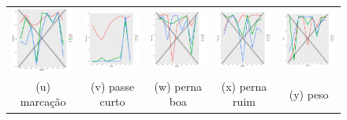 \documentclass[doc,apacite,oneside,a4paper,12pt]{apa6}
\begin{document}
\begin{figure}
\begin{tabular}{ccccc}
   \includegraphics[width=25mm]{marcacao_result_trans_media} & \includegraphics[width=25mm]{passecurto_result_trans_media}   &   \includegraphics[width=25mm]{pernaboa_result_trans_media}&
  \includegraphics[width=25mm]{pernaruim_result_trans_media}   & \includegraphics[width=25mm]{peso_result_trans_media}   \\
 \scriptsize{(u) marcação} & \scriptsize{(v) passe curto } & \scriptsize{(w) perna boa} & \scriptsize{(x) perna ruim} & \scriptsize{(y) peso}\\[3pt]
 

\end{tabular}
\end{figure}
\end{document}
